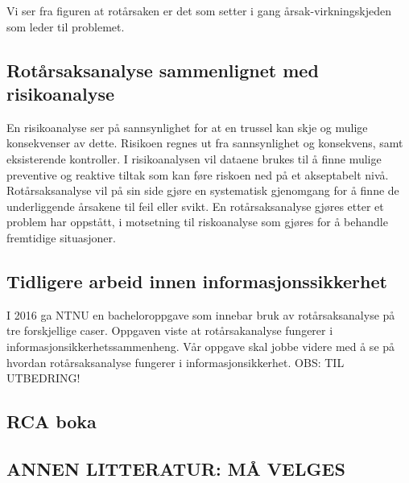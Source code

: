 Vi ser fra figuren at rotårsaken er det som setter i gang årsak-virkningskjeden som leder til problemet. 

\subsection{Rotårsaksanalyse sammenlignet med risikoanalyse}
En risikoanalyse ser på sannsynlighet for at en trussel kan skje og mulige konsekvenser av dette. Risikoen regnes ut fra sannsynlighet og konsekvens, samt eksisterende kontroller. I risikoanalysen vil dataene brukes til å finne mulige preventive og reaktive tiltak som kan føre riskoen ned på et akseptabelt nivå. Rotårsaksanalyse vil på sin side gjøre en systematisk gjenomgang for å finne de underliggende årsakene til feil eller svikt. En rotårsaksanalyse gjøres etter et problem har oppstått, i motsetning til riskoanalyse som gjøres for å behandle fremtidige situasjoner.  

\subsection{Tidligere arbeid innen informasjonssikkerhet}
I 2016 ga NTNU en bacheloroppgave som innebar bruk av rotårsaksanalyse på tre forskjellige caser. Oppgaven viste at rotårsakanalyse fungerer i informasjonsikkerhetssammenheng. Vår oppgave skal jobbe videre med å se på hvordan rotårsaksanalyse fungerer i informasjonsikkerhet. OBS: TIL UTBEDRING!

\subsection{RCA boka} 

\subsection{ANNEN LITTERATUR: MÅ VELGES}
